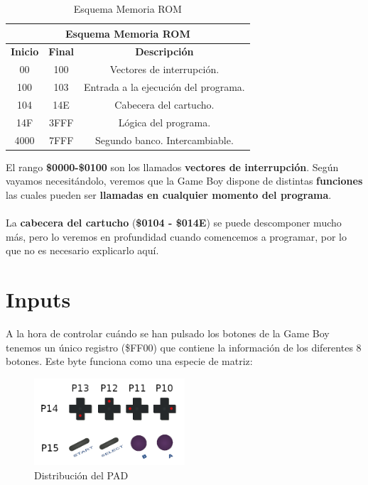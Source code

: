 \begin{table}[h!]
\centering
\begin{tabular}{|c|c|c|}
\hline
\multicolumn{3}{|c|}{\textbf{Esquema Memoria ROM}}                                                                          \\ \hline
\textbf{Inicio} & \textbf{Final} & \textbf{Descripción}                                              \\ \hline
00              & 100  & Vectores de interrupción.               \\ \hline
100             & 103  & Entrada a la ejecución del programa.    \\ \hline
104             & 14E  & Cabecera del cartucho.                  \\ \hline
14F             & 3FFF & Lógica del programa.                    \\ \hline
4000            & 7FFF & Segundo banco. Intercambiable.          \\ \hline
\end{tabular}
\caption{Esquema Memoria ROM}
\label{table:4}
\end{table}

El rango \textbf{\$0000-\$0100} son los llamados \textbf{vectores de interrupción}. Según vayamos necesitándolo, veremos que la Game Boy dispone de distintas \textbf{funciones} las cuales pueden ser \textbf{llamadas en cualquier momento del programa}.
\\ \\
La \textbf{cabecera del cartucho} (\textbf{\$0104 - \$014E}) se puede descomponer mucho más, pero lo veremos en profundidad cuando comencemos a programar, por lo que no es necesario explicarlo aquí.

\clearpage

\section{Inputs}
\label{anexo_input}

A la hora de controlar cuándo se han pulsado los botones de la Game Boy tenemos un único registro (\$FF00) que contiene la información de los diferentes 8 botones. Este byte funciona como una especie de matriz:

\begin{figure}[h]
\centering
\includegraphics[width=0.5\textwidth]{include/images/GameBoy/PAD.png}
\caption{Distribución del PAD}
\label{figure:pad}
\end{figure}

